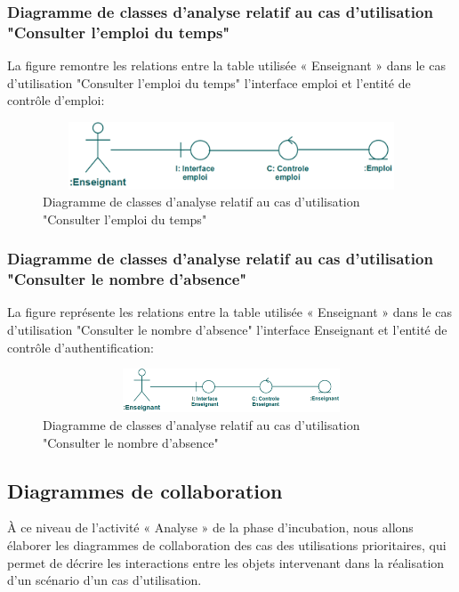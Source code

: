 \documentclass[12 pt ]{report}
\begin{document}
\subsubsection{Diagramme de classes d’analyse relatif au cas d’utilisation  "Consulter l'emploi du temps" }
La figure  remontre les relations entre la table utilisée « Enseignant » dans le cas d’utilisation "Consulter l'emploi du temps" l’interface  emploi et  l'entité de  contrôle d'emploi:
\begin{figure}[h]
\begin{center}
\includegraphics[width= 12cm , height =2cm]{tet.png}
\caption{Diagramme de classes d’analyse relatif au cas d’utilisation "Consulter l'emploi du temps"}
\end{center}
\end{figure} \newpage
\subsubsection{Diagramme de classes d’analyse relatif au cas d’utilisation  "Consulter le nombre d'absence" }
La figure  représente les relations entre la table utilisée « Enseignant » dans le cas d’utilisation "Consulter le nombre d'absence" l’interface  Enseignant et  l'entité de  contrôle d'authentification:
\begin{figure}[h]
\begin{center}
\includegraphics[width= 12cm , height =1.3cm]{ccna.png}
\caption{Diagramme de classes d’analyse relatif au cas d’utilisation "Consulter le nombre d'absence"}
\end{center}
\end{figure}
\subsection{Diagrammes de collaboration }
 À ce niveau de l’activité « Analyse » de la phase d’incubation, nous allons élaborer les diagrammes de collaboration des cas des utilisations prioritaires, qui permet de décrire les interactions entre les
objets intervenant dans la réalisation d’un scénario d’un cas d’utilisation.
\end{document}
